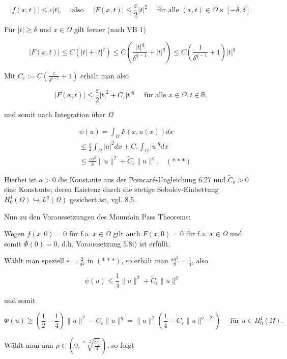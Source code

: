 \documentclass[10pt, letterpaper]{article}
\begin{document}
$$
|f(x, t)| \leq \varepsilon|t|, \quad \text { also } \quad|F(x, t)| \leq \frac{\varepsilon}{2}|t|^{2} \quad \text { für alle }(x, t) \in \Omega \times[-\delta, \delta] \text {. }
$$

Für $|t| \geq \delta$ und $x \in \Omega$ gilt ferner (nach VB 1)

$$
|F(x, t)| \leq C\left(|t|+|t|^{q}\right) \leq C\left(\frac{|t|^{q}}{\delta^{q-1}}+|t|^{q}\right) \leq C\left(\frac{1}{\delta^{q-1}}+1\right)|t|^{q}
$$

Mit $C_{\varepsilon}:=C\left(\frac{1}{\delta^{q-1}}+1\right)$ erhält man also

$$
|F(x, t)| \leq \frac{\varepsilon}{2}|t|^{2}+C_{\varepsilon}|t|^{q} \quad \text { für alle } x \in \Omega, t \in \mathbb{R} \text {, }
$$

und somit nach Integration über $\Omega$

$$
\begin{aligned}
& \psi(u)=\int_{\Omega} F(x, u(x)) d x \\
& \leq \frac{\varepsilon}{2} \int_{\Omega}|u|^{2} d x+C_{\varepsilon} \int_{\Omega}|u|^{q} d x \\
& \leq \frac{\varepsilon a^{2}}{8}\|u\|^{2}+\tilde{C}_{\varepsilon}\|u\|^{q} . \quad(* * *)
\end{aligned}
$$

Hierbei ist $a>0$ die Konstante aus der Poincaré-Ungleichung 6.27 und $\tilde{C}_{\varepsilon}>0$ eine Konstante, deren Existenz durch die stetige Sobolev-Einbettung $H_{0}^{1}(\Omega) \hookrightarrow L^{q}(\Omega)$ gesichert ist, vgl. 8.5.

Nun zu den Voraussetzungen des Mountain Pass Theorems:

Wegen $f(x, 0)=0$ für f.a. $x \in \Omega$ gilt auch $F(x, 0)=0$ für f.a. $x \in \Omega$ und somit $\Phi(0)=0$, d.h. Voraussetzung 5.8i) ist erfüllt.

Wählt man speziell $\varepsilon=\frac{2}{a^{2}}$ in $(* * *)$, so erhält man $\frac{\varepsilon a^{2}}{8}=\frac{1}{4}$, also

$$
\psi(u) \leq \frac{1}{4}\|u\|^{2}+\tilde{C}_{\varepsilon}\|u\|^{q}
$$

und somit

$$
\Phi(u) \geq\left(\frac{1}{2}-\frac{1}{4}\right)\|u\|^{2}-\tilde{C}_{\varepsilon}\|u\|^{q}=\|u\|^{2}\left(\frac{1}{4}-\tilde{C}_{\varepsilon}\|u\|^{q-2}\right) \quad \text { für } u \in H_{0}^{1}(\Omega) \text {. }
$$

Wählt man nun $\rho \in\left(0, \sqrt[q-2]{\frac{\tilde{C}_{\varepsilon}}{4}}\right)$, so folgt
\end{document}
